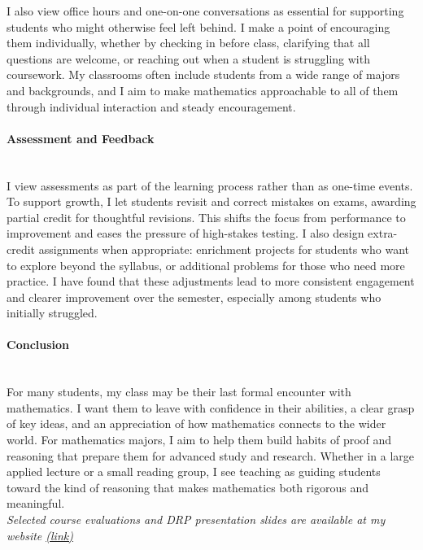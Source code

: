 \documentclass[11pt]{article}
\begin{document}
I also view office hours and one-on-one conversations as essential for supporting students who might otherwise feel left behind. 
I make a point of encouraging them individually, whether by checking in before class, clarifying that all questions are welcome, or reaching out when a student is struggling with coursework.
My classrooms often include students from a wide range of majors and backgrounds, and I aim to make mathematics approachable to all of them through individual interaction and steady encouragement.


\paragraph{Assessment and Feedback}\quad \\
I view assessments as part of the learning process rather than as one-time events. To support growth, I let students revisit and correct mistakes on exams, awarding partial credit for thoughtful revisions. This shifts the focus from performance to improvement and eases the pressure of high-stakes testing. I also design extra-credit assignments when appropriate: enrichment projects for students who want to explore beyond the syllabus, or additional problems for those who need more practice. I have found that these adjustments lead to more consistent engagement and clearer improvement over the semester, especially among students who initially struggled.



\paragraph{Conclusion} \quad \\
For many students, my class may be their last formal encounter with mathematics. I want them to leave with confidence in their abilities, a clear grasp of key ideas, and an appreciation of how mathematics connects to the wider world. For mathematics majors, I aim to help them build habits of proof and reasoning that prepare them for advanced study and research. Whether in a large applied lecture or a small reading group, I see teaching as guiding students toward the kind of reasoning that makes mathematics both rigorous and meaningful.
\\

\hfill
\noindent \textit{ \small Selected course evaluations and DRP presentation slides are available at my website \href{https://sites.google.com/view/myungsin-cho/teaching?authuser=0}{(link)}}
\end{document}
